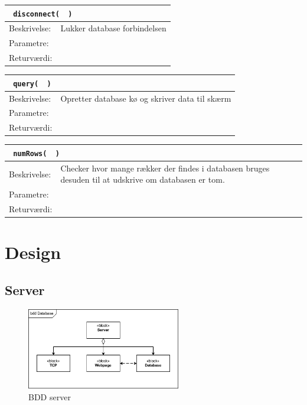 \begin{table}[H]
\begin{tabular}{l p{12.5cm}}
\multicolumn{2}{l}{\texttt{\textcolor{blue}{} disconnect( \textcolor{blue}{} )}} \\
\hline
Beskrivelse:&Lukker database forbindelsen\\
Parametre:&\\
Returværdi:&\\
\end{tabular}
\end{table}

\begin{table}[H]
\begin{tabular}{l p{12.5cm}}
\multicolumn{2}{l}{\texttt{\textcolor{blue}{} query( \textcolor{blue}{} )}} \\
\hline
Beskrivelse:&Opretter database kø og skriver data til skærm\\
Parametre:&\\
Returværdi:&\\
\end{tabular}
\end{table}

\begin{table}[H]
\begin{tabular}{l p{12.5cm}}
\multicolumn{2}{l}{\texttt{\textcolor{blue}{} numRows( \textcolor{blue}{} )}} \\
\hline
Beskrivelse:&Checker hvor mange rækker der findes i databasen bruges desuden til at udskrive om databasen er tom.\\
Parametre:&\\
Returværdi:&\\
\end{tabular}
\end{table}

\section{Design}
\subsection{Server}
\begin{figure}[htbp]
	\centering
	\includegraphics[width=0.6\textwidth]{billeder/bdd_server}
	\caption{BDD server}
	\label{fig:bdd_server}
\end{figure}






